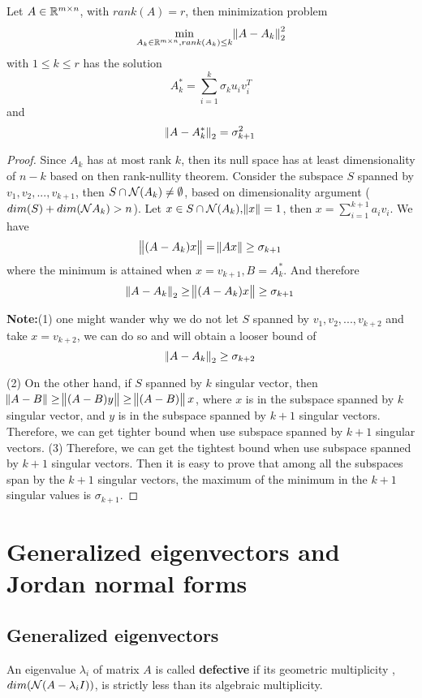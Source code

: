 \begin{refsection}
\begin{theorem}\label{ch:linearalgebra:th:SVD2normlowrankapproximation}
Let $A \in \mathbb{R}^{m\times n}$, with $rank(A)=r$, then minimization problem
$$\min_{A_k \in \mathbb{R}^{m\times n},rank(A_k)\leq k} \norm{A-A_k}^2_2$$
with $1\leq k\leq r$ has the solution
$$A_k^* = \sum_{i=1}^k \sigma_k u_i v_i^T$$
and 
$$\norm{A-A_k^*}_2 = \sigma^2_{k+1}$$
\end{theorem}
\begin{proof}
Since $A_k$ has at most rank $k$, then its null space has at least dimensionality of $n-k$ based on then rank-nullity theorem. Consider the subspace $S$ spanned by $ v_{1},v_{2},...,v_{k+1}$, then $S\cap \mathcal{N}(A_k)\neq \emptyset$, based on dimensionality argument ($dim(S)+dim(\mathcal{N}{A_k})>n$). Let $x\in S\cap \mathcal{N}(A_k),\norm{x}=1$, then $x=\sum_{i=1}^{k+1}a_i v_i$. We have
$$\norm{(A-A_k)x} = \norm{Ax} \geq \sigma_{k+1}$$
where the minimum is attained when $x = v_{k+1}, B=A_k^*$. And therefore $$\norm{A-A_k}_2 \geq \norm{(A-A_k)x} \geq \sigma_{k+1}$$

\textbf{Note:}(1) one might wander why we do not let $S$ spanned by $ v_{1},v_{2},...,v_{k+2}$ and take $x=v_{k+2}$, we can do so and will obtain a looser bound of $$\norm{A-A_k}_2 \geq \sigma_{k+2}$$

(2) On the other hand, if $S$ spanned by $k$ singular vector, then $\norm{A-B} \geq \norm{(A-B)y} \geq \norm{(A-B)}x$, where $x$ is in the subspace spanned by $k$ singular vector, and $y$ is in the subspace spanned by $k+1$ singular vectors. Therefore, we can get tighter bound when use subspace spanned by $k+1$ singular vectors. 
(3) Therefore, we can get the tightest bound when use subspace spanned by $k+1$ singular vectors. Then it is easy to  prove that among all the subspaces span by the $k+1$ singular vectors, the maximum of the minimum in the $k+1$ singular values is $\sigma_{k+1}$. 

\end{proof}




\section{Generalized eigenvectors and Jordan normal forms}
\subsection{Generalized eigenvectors}
\begin{definition}
	An eigenvalue $\lambda_i$ of matrix $A$ is called \textbf{defective} if its geometric multiplicity ,$dim(\mathcal{N}(A-\lambda_i I))$, is strictly less than its algebraic multiplicity.  
\end{definition}


\end{refsection}
